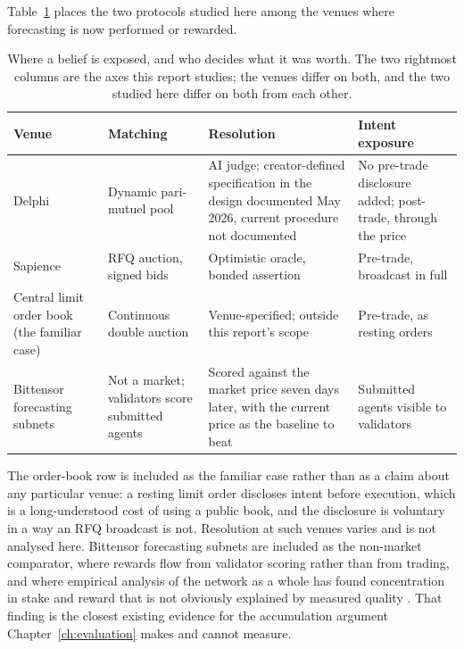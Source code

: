 Table~\ref{tab:landscape} places the two protocols studied here among the venues where
forecasting is now performed or rewarded.

\begin{table}[htbp]
\centering
\small
\begin{tabularx}{\textwidth}{p{}p{}p{}X}
\toprule
\textbf{Venue} & \textbf{Matching} & \textbf{Resolution} & \textbf{Intent exposure} \\
\midrule
Delphi & Dynamic pari-mutuel pool \cite{pennock2004dpm,gensyn2026delphi} & AI judge; creator-defined specification in the design documented May 2026, current procedure not documented \cite{gensyn2026delphi,gensyn2026sdk} & No pre-trade disclosure added; post-trade, through the price \\
Sapience & RFQ auction, signed bids \cite{sapience2026relayer} & Optimistic oracle, bonded assertion \cite{uma2026oracle} & Pre-trade, broadcast in full \\
Central limit order book (the familiar case) & Continuous double auction & Venue-specified; outside this report's scope & Pre-trade, as resting orders \\
Bittensor forecasting subnets & Not a market; validators score submitted agents \cite{numinousgithub} & Scored against the market price seven days later, with the current price as the baseline to beat \cite{numinousgithub} & Submitted agents visible to validators \\
\bottomrule
\end{tabularx}
\caption{Where a belief is exposed, and who decides what it was worth. The two rightmost
columns are the axes this report studies; the venues differ on both, and the two studied
here differ on both from each other.}
\label{tab:landscape}
\end{table}

The order-book row is included as the familiar case rather than as a claim about any
particular venue: a resting limit order discloses intent before execution, which is a
long-understood cost of using a public book, and the disclosure is voluntary in a way an RFQ
broadcast is not. Resolution at such venues varies and is not analysed here. Bittensor forecasting
subnets are included as the non-market comparator, where rewards flow from validator scoring
rather than from trading, and where empirical analysis of the network as a whole has found
concentration in stake and reward that is not obviously explained by measured quality
\cite{lui2025bittensor}. That
finding is the closest existing evidence for the accumulation argument
Chapter~\ref{ch:evaluation} makes and cannot measure.

